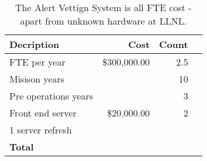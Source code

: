 \tiny \begin{longtable} {|l|r|r|r|} \caption{The Alert Vettign System is all FTE cost - apart from unknown hardware at LLNL. \label{tab:eliminate}}\\ 
\hline 
\textbf{Decription}&\textbf{Cost}&\textbf{Count} \\ \hline
{FTE per year}&{\$300,000.00}&{2.5} \\ \hline
{Misison years}&{}&{10} \\ \hline
{Pre operations years}&{}&{3} \\ \hline
{Front end server}&{\$20,000.00}&{2} \\ \hline
{1 server refresh }&{}&{} \\ \hline
\textbf{Total}&\textbf{}&\textbf{} \\ \hline
\end{longtable} \normalsize
